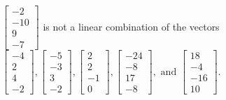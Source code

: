 \begin{exercise}
\begin{exerciseStatement}
  \end{exerciseStatement}
  \begin{exerciseAnswer}
   \(\left[\begin{array}{c}
-2 \\
-10 \\
9 \\
-7
\end{array}\right]\) 
  	 is not  
	a linear combination of the vectors \(\left[\begin{array}{c}
-4 \\
2 \\
4 \\
-2
\end{array}\right] , \left[\begin{array}{c}
-5 \\
-3 \\
3 \\
-2
\end{array}\right] , \left[\begin{array}{c}
2 \\
2 \\
-1 \\
0
\end{array}\right] , \left[\begin{array}{c}
-24 \\
-8 \\
17 \\
-8
\end{array}\right] , \text{ and } \left[\begin{array}{c}
18 \\
-4 \\
-16 \\
10
\end{array}\right]\).

	
  


  \end{exerciseAnswer}
\end{exercise}